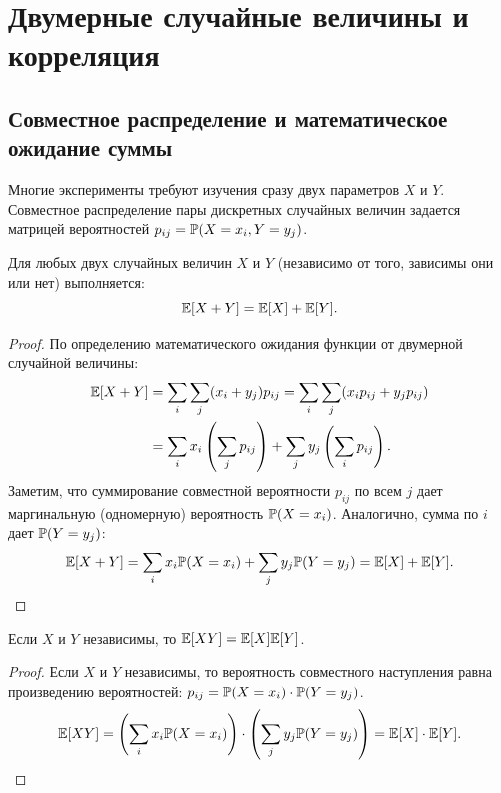 \section{Двумерные случайные величины и корреляция}

\subsection{Совместное распределение и математическое ожидание суммы}

Многие эксперименты требуют изучения сразу двух параметров $X$ и $Y$. Совместное распределение пары дискретных случайных величин задается матрицей вероятностей $p_{ij} = \mathbb{P}(X = x_i, Y = y_j)$.

\begin{theorem}
Для любых двух случайных величин $X$ и $Y$ (независимо от того, зависимы они или нет) выполняется:
\[
\mathbb{E}[X + Y] = \mathbb{E}[X] + \mathbb{E}[Y].
\]
\end{theorem}

\begin{proof}
По определению математического ожидания функции от двумерной случайной величины:
\begin{align*}
\mathbb{E}[X + Y] &= \sum_{i} \sum_{j} (x_i + y_j) p_{ij} = \sum_{i} \sum_{j} (x_i p_{ij} + y_j p_{ij}) \\
&= \sum_{i} x_i \left( \sum_{j} p_{ij} \right) + \sum_{j} y_j \left( \sum_{i} p_{ij} \right).
\end{align*}
Заметим, что суммирование совместной вероятности $p_{ij}$ по всем $j$ дает маргинальную (одномерную) вероятность $\mathbb{P}(X = x_i)$. Аналогично, сумма по $i$ дает $\mathbb{P}(Y = y_j)$:
\[
\mathbb{E}[X + Y] = \sum_{i} x_i \mathbb{P}(X = x_i) + \sum_{j} y_j \mathbb{P}(Y = y_j) = \mathbb{E}[X] + \mathbb{E}[Y].
\]
\end{proof}

\begin{theorem}
Если $X$ и $Y$ независимы, то $\mathbb{E}[XY] = \mathbb{E}[X]\mathbb{E}[Y]$.
\end{theorem}

\begin{proof}
Если $X$ и $Y$ независимы, то вероятность совместного наступления равна произведению вероятностей: $p_{ij} = \mathbb{P}(X = x_i) \cdot \mathbb{P}(Y = y_j)$.
\[
\mathbb{E}[XY] = \left( \sum_i x_i \mathbb{P}(X = x_i) \right) \cdot \left( \sum_j y_j \mathbb{P}(Y = y_j) \right) = \mathbb{E}[X] \cdot \mathbb{E}[Y].
\]
\end{proof}

